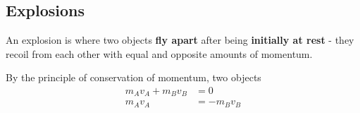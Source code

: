 \subsection{Explosions}

An explosion is where two objects \textbf{fly apart} after being \textbf{initially at rest} - they recoil from each other with equal and opposite amounts of momentum.

By the principle of conservation of momentum, two objects
\begin{align*}
    m_Av_A+m_Bv_B&=0\\
    m_Av_A&=-m_Bv_B
\end{align*}
